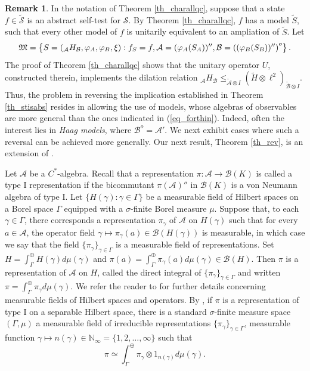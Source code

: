 \documentclass[11pt]{amsart}
\theoremstyle{definition}
\newtheorem{remark}[theorem]{Remark}
\newcommand{\cl}[1]{\mathcal{#1}}
\begin{document}
\begin{remark}\label{r_locality0}
\rm
In the notation of Theorem \ref{th_charallqc}, 
suppose that a state $f\in \tilde{\cl S}$ is an abstract self-test for $\cl S$. 
By Theorem \ref{th_charallqc}, $f$ has a model $\tilde{S}$, such that every other model of $f$
is unitarily equivalent to an ampliation of $\tilde{S}$. 
Let 
\begin{equation}\label{eq_forthin}
\frak M = 
\left\{S=(_{\cl A}H_{\cl B}, \varphi_A, \varphi_B,\xi) : f_S = f, 
\cl A=(\varphi_A(S_A))'', \cl B = \left((\varphi_B(S_B))''\right)^o\right\}.
\end{equation}
The proof of Theorem \ref{th_charallqc}
shows that the unitary operator $U$, constructed therein, 
implements the dilation relation 
$_{\cl A}H_{\cl B}\leq _{\tilde{\cl A}\otimes I}(\tilde H\otimes\ell^2)_{\tilde{\cl B}\otimes I}$. 
Thus, the problem in reversing the implication established in Theorem \ref{th_stisabs} resides in allowing the use of
models, whose algebras of observables are more general than the 
ones indicated in (\ref{eq_forthin}). Indeed, often the interest lies in 
\emph{Haag models}, where $\cl B^o = \cl A'$.
We next exhibit cases where such a reversal can be achieved more generally. 
Our next result, 
Theorem \ref{th_rev},
is an extension of \cite[Theorem 4.12]{pszz}.
\end{remark}

Let $\cl A$ be a $C^*$-algebra. 
Recall that a representation $\pi : \cl A\to \cl B(K)$
is called a type I representation if 
the bicommutant $\pi(\cl A)''$ in 
$\cl B(K)$ is a von Neumann algebra of type I.  
Let $\{ H(\gamma): \gamma\in \Gamma\}$ be a measurable field of Hilbert spaces on a Borel space $\Gamma$ equipped with a $\sigma$-finite Borel measure $\mu$. Suppose that, to each $\gamma\in \Gamma$, there corresponds a representation $\pi_\gamma$ of $\cl A$ on $H(\gamma)$ such that for every $a\in \cl A$, the operator field $\gamma\mapsto\pi_\gamma(a)\in\cl B(H(\gamma))$ is measurable, in which case we say that the field $\{\pi_\gamma\}_{\gamma\in\Gamma}$ is a measurable field of representations. Set $H =\int_\Gamma^{\oplus}H(\gamma)d\mu(\gamma)$ and 
$\pi(a) = \int_\Gamma^{\oplus}\pi_\gamma(a)d\mu(\gamma)\in \cl B(H)$. Then $\pi$ is a representation of $\cl A$ on $H$, called the direct integral of $\{\pi_\gamma\}_{\gamma\in\Gamma}$ and written 
$\pi = \int_\Gamma^{\oplus}\pi_\gamma d\mu(\gamma)$.
We refer the reader to \cite[\S IV.8]{takesaki} for further details concerning measurable fields of Hilbert spaces and operators. 
 By \cite{dixmier}, if $\pi$ is a representation of type I on a separable Hilbert space, there is a standard $\sigma$-finite measure space $(\Gamma,\mu)$ a measurable field of irreducible representations $\{\pi_\gamma\}_{\gamma\in\Gamma}$, measurable function $\gamma\mapsto n(\gamma)\in \mathbb N_{\infty}=\{1,2,\ldots,\infty\}$ such that 
$$\pi\simeq\int^\oplus_\Gamma\pi_\gamma\otimes 1_{n(\gamma)}d\mu(\gamma).$$  
\end{document}
